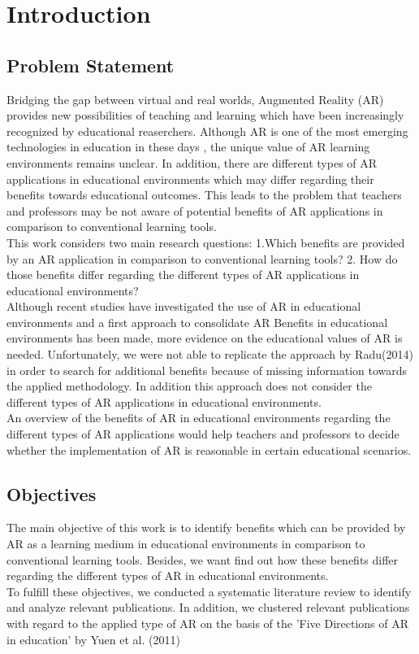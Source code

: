 \section{Introduction}
\subsection{Problem Statement}
Bridging the gap between virtual and real worlds, Augmented Reality (AR) provides new possibilities of teaching and learning which have been increasingly recognized by educational reaserchers. \autocite [cf.][41]{Wu.2013} Although AR is one of the most emerging technologies in education in these days \autocite [cf.]{Johnson.2010}, the unique value of AR learning environments remains unclear. \autocite [cf.][48]{Wu.2013} In addition, there are different types of AR applications in educational environments which may differ regarding their benefits towards educational outcomes. \autocite [cf.][127-130]{Yuen.2011} This leads to the problem that teachers and professors may be not aware of potential benefits of AR applications in comparison to conventional learning tools. \\
This work considers two main research questions: 1.Which benefits are provided by an AR application in comparison to conventional learning tools? 2. How do those benefits differ regarding the different types of AR applications in educational environments? \\
Although recent studies have investigated the use of AR in educational environments \autocite {Wu.2013}\mulcit\autocite {Lee.2012} and a first approach to consolidate AR Benefits in educational environments has been made, \autocite [cf.]{Radu.2014} more evidence on the educational values of AR is needed. Unfortunately, we were not able to replicate the approach by Radu(2014) in order to search for additional benefits because of missing information towards the applied methodology. In addition this approach does not consider the different types of AR applications in educational environments.\\
An overview of the benefits of AR in educational environments regarding the different types of AR applications would help teachers and professors to decide whether the implementation of AR is reasonable in certain educational scenarios.\\
\subsection{Objectives}
The main objective of this work is to identify benefits which can be provided by AR as a learning medium in educational environments in comparison to conventional learning tools. Besides, we want find out how these benefits differ regarding the different types of AR in educational environments. \\
To fulfill these objectives, we conducted a systematic literature review to identify and analyze relevant publications. In addition, we clustered relevant publications with regard to the applied type of AR on the basis of the 'Five Directions of AR in education' by Yuen et al. (2011)
